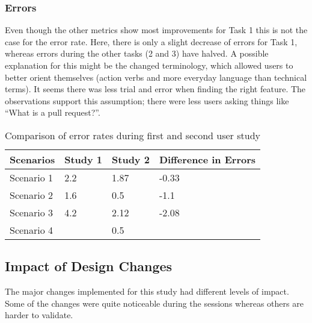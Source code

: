 \begin{table}[h!]
\centering
{}
\caption{Time on tasks (in seconds)}
\label{table:time-tasks}
\end{table}

\subsubsection{Errors}
Even though the other metrics show most improvements for Task 1 this is not the case for the error rate. Here, there is only a slight decrease of errors for Task 1, whereas errors during the other tasks (2 and 3) have halved. A possible explanation for this might be the changed terminology, which allowed users to better orient themselves (action verbs and more everyday language than technical terms). It seems there was less trial and error when finding the right feature. The observations support this assumption; there were less users asking things like “What is a pull request?”.

\begin{table}[h!]
\centering
\begin{tabular}{|l|l|l|l|}
\hline
\rowcolor[HTML]{EFEFEF}
{\bf Scenarios} & {\bf Study 1} & {\bf Study 2} & {\bf Difference in Errors} \\ \hline
Scenario 1 & 2.2 & 1.87 & -0.33 \\ \hline
Scenario 2 & 1.6 & 0.5 & -1.1 \\ \hline
Scenario 3 & 4.2 & 2.12 & -2.08 \\ \hline
Scenario 4 &  & 0.5 &  \\ \hline
\end{tabular}
\caption{Comparison of error rates during first and second user study }
\label{table:second-study-error-rate}
\end{table}

\subsection{Impact of Design Changes}
The major changes implemented for this study had different levels of impact. Some of the changes were quite noticeable during the sessions whereas others are harder to validate.

